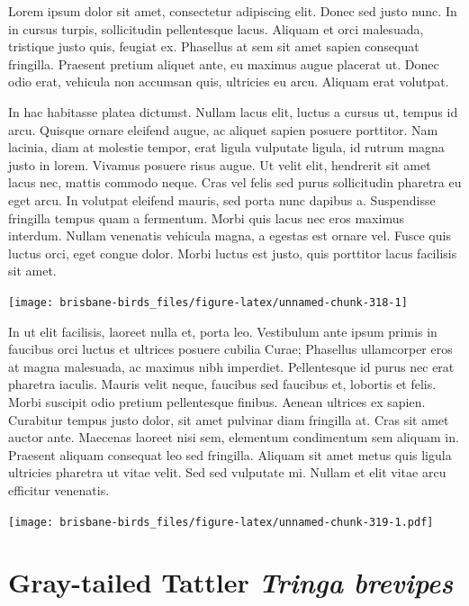 \documentclass[]{book}
\let\origfigure\figure
\let\endorigfigure\endfigure
\renewenvironment{figure}[1][2] {
  \expandafter\origfigure\expandafter[H]
} {
  \endorigfigure
}
\begin{document}
Lorem ipsum dolor sit amet, consectetur adipiscing elit. Donec sed justo
nunc. In in cursus turpis, sollicitudin pellentesque lacus. Aliquam et
orci malesuada, tristique justo quis, feugiat ex. Phasellus at sem sit
amet sapien consequat fringilla. Praesent pretium aliquet ante, eu
maximus augue placerat ut. Donec odio erat, vehicula non accumsan quis,
ultricies eu arcu. Aliquam erat volutpat.

In hac habitasse platea dictumst. Nullam lacus elit, luctus a cursus ut,
tempus id arcu. Quisque ornare eleifend augue, ac aliquet sapien posuere
porttitor. Nam lacinia, diam at molestie tempor, erat ligula vulputate
ligula, id rutrum magna justo in lorem. Vivamus posuere risus augue. Ut
velit elit, hendrerit sit amet lacus nec, mattis commodo neque. Cras vel
felis sed purus sollicitudin pharetra eu eget arcu. In volutpat eleifend
mauris, sed porta nunc dapibus a. Suspendisse fringilla tempus quam a
fermentum. Morbi quis lacus nec eros maximus interdum. Nullam venenatis
vehicula magna, a egestas est ornare vel. Fusce quis luctus orci, eget
congue dolor. Morbi luctus est justo, quis porttitor lacus facilisis sit
amet.

\begin{figure}
\texttt{[image: brisbane-birds\_files/figure-latex/unnamed-chunk-318-1]} \caption{insert figure caption}\label{fig:unnamed-chunk-318}
\end{figure}

In ut elit facilisis, laoreet nulla et, porta leo. Vestibulum ante ipsum
primis in faucibus orci luctus et ultrices posuere cubilia Curae;
Phasellus ullamcorper eros at magna malesuada, ac maximus nibh
imperdiet. Pellentesque id purus nec erat pharetra iaculis. Mauris velit
neque, faucibus sed faucibus et, lobortis et felis. Morbi suscipit odio
pretium pellentesque finibus. Aenean ultrices ex sapien. Curabitur
tempus justo dolor, sit amet pulvinar diam fringilla at. Cras sit amet
auctor ante. Maecenas laoreet nisi sem, elementum condimentum sem
aliquam in. Praesent aliquam consequat leo sed fringilla. Aliquam sit
amet metus quis ligula ultricies pharetra ut vitae velit. Sed sed
vulputate mi. Nullam et elit vitae arcu efficitur venenatis.

\begin{figure}
\centering
\texttt{[image: brisbane-birds\_files/figure-latex/unnamed-chunk-319-1.pdf]}
\caption{\label{fig:unnamed-chunk-319}insert figure caption}
\end{figure}

\section{\texorpdfstring{Gray-tailed Tattler \emph{Tringa
brevipes}}{Gray-tailed Tattler Tringa brevipes}}\label{gray-tailed-tattler-tringa-brevipes}
\end{document}

